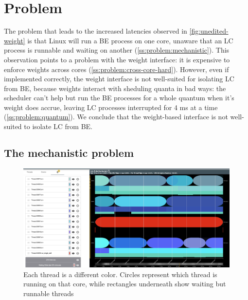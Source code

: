 \section{Problem}\label{s:problem}

The problem that leads to the increased latencies observed in
\autoref{fig:unedited-weight} is that Linux will run a BE process on one core,
unaware that an LC process is runnable and waiting on another
(\autoref{ss:problem:mechanistic}). This observation points to a problem with
the \cgroups{} weight interface: it is expensive to enforce weights across cores
(\autoref{ss:problem:cross-core-hard}). However, even if implemented correctly,
the \cgroups{} weight interface is not well-suited for isolating LC from BE,
because weights interact with sheduling quanta in bad ways: the scheduler can't
help but run the BE processes for a whole quantum when it's weight does accrue,
leaving LC processes interrupted for 4 ms at a time
(\autoref{ss:problem:quantum}). We conclude that the weight-based interface is
not well-suited to isolate LC from BE.

\subsection{The mechanistic problem}\label{ss:problem:mechanistic}

\begin{figure}[t]
    \centering
    \includegraphics[width=\columnwidth]{graphs/schedviz-problem.png}
    \caption{Each thread is a different color. Circles represent which
    thread is running on that core, while rectangles underneath show waiting but
    runnable threads
    }\label{fig:schedviz-problem}
\end{figure}


